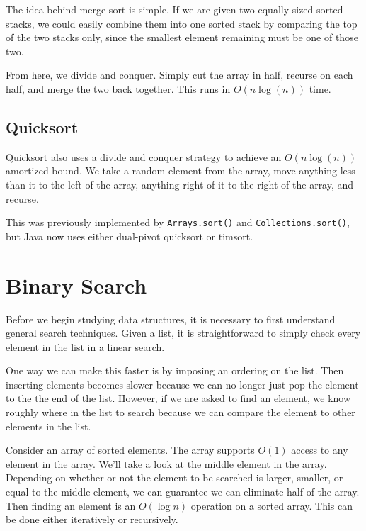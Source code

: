 The idea behind merge sort is simple. If we are given two equally sized sorted stacks, we could easily combine them into one sorted stack by comparing the top of the two stacks only, since the smallest element remaining must be one of those two.

From here, we divide and conquer. Simply cut the array in half, recurse on each half, and merge the two back together. This runs in $O(n \log (n))$ time.

\subsection{Quicksort}

Quicksort also uses a divide and conquer strategy to achieve an $O(n \log (n))$ amortized bound. We take a random element from the array, move anything less than it to the left of the array, anything right of it to the right of the array, and recurse.

This was previously implemented by \texttt{Arrays.sort()} and \texttt{Collections.sort()}, but Java now uses either dual-pivot quicksort or timsort.

\section{Binary Search}

Before we begin studying data structures, it is necessary to first understand general search techniques. Given a list, it is straightforward to simply check every element in the list in a linear search.

One way we can make this faster is by imposing an ordering on the list. Then inserting elements becomes slower because we can no longer just pop the element to the the end of the list. However, if we are asked to find an element, we know roughly where in the list to search because we can compare the element to other elements in the list.

Consider an array of sorted elements. The array supports $O(1)$ access to any element in the array. We'll take a look at the middle element in the array. Depending on whether or not the element to be searched is larger, smaller, or equal to the middle element, we can guarantee we can eliminate half of the array. Then finding an element is an $O(\log{n})$ operation on a sorted array. This can be done either iteratively or recursively.

